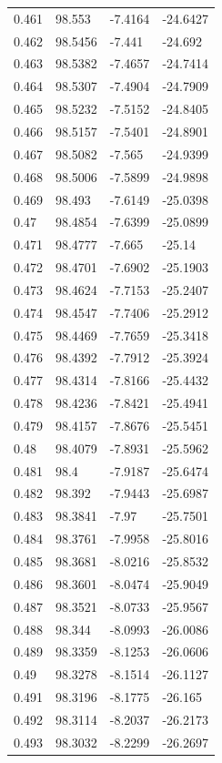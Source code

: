 \begin{tabular}{llll}
0.461 & 98.553 & -7.4164 & -24.6427 \\
0.462 & 98.5456 & -7.441 & -24.692 \\
0.463 & 98.5382 & -7.4657 & -24.7414 \\
0.464 & 98.5307 & -7.4904 & -24.7909 \\
0.465 & 98.5232 & -7.5152 & -24.8405 \\
0.466 & 98.5157 & -7.5401 & -24.8901 \\
0.467 & 98.5082 & -7.565 & -24.9399 \\
0.468 & 98.5006 & -7.5899 & -24.9898 \\
0.469 & 98.493 & -7.6149 & -25.0398 \\
0.47 & 98.4854 & -7.6399 & -25.0899 \\
0.471 & 98.4777 & -7.665 & -25.14 \\
0.472 & 98.4701 & -7.6902 & -25.1903 \\
0.473 & 98.4624 & -7.7153 & -25.2407 \\
0.474 & 98.4547 & -7.7406 & -25.2912 \\
0.475 & 98.4469 & -7.7659 & -25.3418 \\
0.476 & 98.4392 & -7.7912 & -25.3924 \\
0.477 & 98.4314 & -7.8166 & -25.4432 \\
0.478 & 98.4236 & -7.8421 & -25.4941 \\
0.479 & 98.4157 & -7.8676 & -25.5451 \\
0.48 & 98.4079 & -7.8931 & -25.5962 \\
0.481 & 98.4 & -7.9187 & -25.6474 \\
0.482 & 98.392 & -7.9443 & -25.6987 \\
0.483 & 98.3841 & -7.97 & -25.7501 \\
0.484 & 98.3761 & -7.9958 & -25.8016 \\
0.485 & 98.3681 & -8.0216 & -25.8532 \\
0.486 & 98.3601 & -8.0474 & -25.9049 \\
0.487 & 98.3521 & -8.0733 & -25.9567 \\
0.488 & 98.344 & -8.0993 & -26.0086 \\
0.489 & 98.3359 & -8.1253 & -26.0606 \\
0.49 & 98.3278 & -8.1514 & -26.1127 \\
0.491 & 98.3196 & -8.1775 & -26.165 \\
0.492 & 98.3114 & -8.2037 & -26.2173 \\
0.493 & 98.3032 & -8.2299 & -26.2697 \\

\end{tabular}
